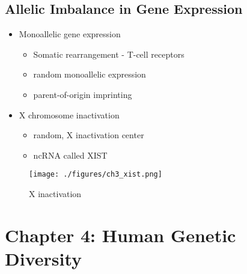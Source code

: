 \documentclass{scrartcl}
\begin{document}
\subsection{Allelic Imbalance in Gene Expression}
\label{sec:orgf6d306b}
\begin{itemize}
\item Monoallelic gene expression
\begin{itemize}
\item Somatic rearrangement - T-cell receptors
\item random monoallelic expression
\item parent-of-origin imprinting
\end{itemize}
\item X chromosome inactivation
\begin{itemize}
\item random, X inactivation center
\item ncRNA called XIST
\end{itemize}
\end{itemize}

\begin{figure}[htbp]
\centering
\texttt{[image: ./figures/ch3\_xist.png]}
\caption{\label{fig:orge181171}
X inactivation}
\end{figure}

\section{Chapter 4: Human Genetic Diversity}
\label{sec:orgc114bdc}
\end{document}
